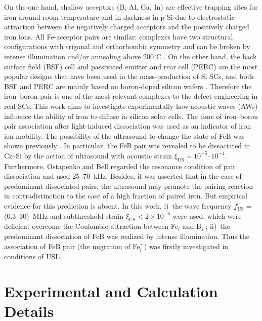 \documentclass[sn-mathphys]{sn-jnl}%
\theoremstyle{thmstyleone}%
\theoremstyle{thmstyletwo}%
\theoremstyle{thmstylethree}%
\begin{document}
On the one hand, shallow acceptors (B, Al, Ga, In) are effective trapping sites for iron around room temperature
and in darkness in p-Si due to electrostatic attraction between the negatively charged
acceptors and the positively charged iron ions.
All Fe-acceptor pairs are similar:
complexes have two structural configurations
with trigonal and orthorhombic symmetry and can be broken by
intense illumination and/or annealing above 200$^\circ$C \cite{Istratov1999,FeBKinAPL2013}.
On the other hand, the back surface field (BSF) cell and passivated emitter and rear cell (PERC)
are the most popular designs that have been used in the mass-production of Si SCs,
and both BSF and PERC are mainly  based on boron-doped silicon wafers \cite{SCRev2020,GreenRew2019}.
Therefore the iron--boron pair is one of the most relevant complexes to the defect engineering in real SCs.
This work aims to investigate experimentally how acoustic waves (AWs) influence the ability of iron to diffuse in silicon solar cells.
The time of iron--boron pair association after  light-induced dissociation was used as an indicator of iron ion mobility.
The possibility of the ultrasound to  change the state of FeB was shown previously  \cite{Ostapenko1994APL,Ostapenko1995}.
In particular, the
FeB pair was revealed \cite{Ostapenko1995} to be dissociated in Cz–Si by the action of ultrasound with acoustic strain $\xi_\mathrm{US}=10^{-5}$--$10^{-4}$.
Furthermore, Ostapenko and Bell \cite{Ostapenko1995} regarded the resonance condition of pair dissociation and used 25--70~kHz.
Besides, it was asserted \cite{Ostapenko1994APL} that in the case of
predominant dissociated pairs, the ultrasound may promote the pairing reaction in contradistinction to the case of a
high fraction of paired iron.
But  empirical evidence  for this prediction  is absent.
In this work,
i)~the wave frequency $f_\mathrm{US}=$(0.3--30)~MHz and subthreshold strain $\xi_\mathrm{US}<2\times10^{-6}$ were used, which were deficient overcome the Coulombic attraction between Fe$_i$ and B$_s^-$;
ii)~the predominant  dissociation of FeB was realized by intense illumination.
Thus the association of FeB pair (the migration  of Fe$_i^+$) was firstly investigated in conditions of USL.


\section{Experimental and Calculation Details}
\label{sec:1}
\end{document}
